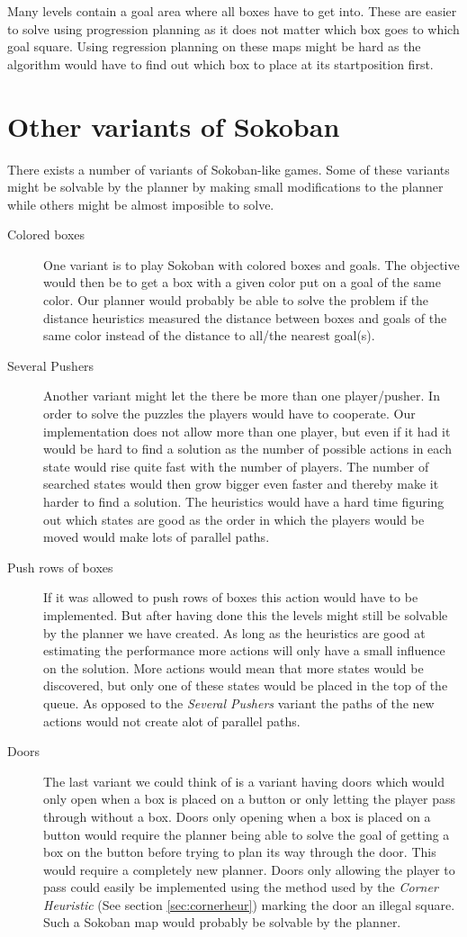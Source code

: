 Many levels contain a goal area where all boxes have to get into. These are easier to solve using progression planning as it does not matter which box goes to which goal square. Using regression planning on these maps might be hard as the algorithm would have to find out which box to place at its startposition first.

\section{Other variants of Sokoban}
There exists a number of variants of Sokoban-like games. Some of these variants might be solvable by the planner by making small modifications to the planner while others might be almost imposible to solve.

\begin{description}
\item[Colored boxes] One variant is to play Sokoban with colored boxes and goals. The objective would then be to get a box with a given color put on a goal of the same color. Our planner would probably be able to solve the problem if the distance heuristics measured the distance between boxes and goals of the same color instead of the distance to all/the nearest goal(s).
\item[Several Pushers] Another variant might let the there be more than one player/pusher. In order to solve the puzzles the players would have to cooperate. Our implementation does not allow more than one player, but even if it had it would be hard to find a solution as the number of possible actions in each state would rise quite fast with the number of players. The number of searched states would then grow bigger even faster and thereby make it harder to find a solution. The heuristics would have a hard time figuring out which states are good as the order in which the players would be moved would make lots of parallel paths.
\item[Push rows of boxes] If it was allowed to push rows of boxes this action would have to be implemented. But after having done this the levels might still be solvable by the planner we have created. As long as the heuristics are good at estimating the performance more actions will only have a small influence on the solution. More actions would mean that more states would be discovered, but only one of these states would be placed in the top of the queue. As opposed to the \textit{Several Pushers} variant the paths of the new actions would not create alot of parallel paths.
\item[Doors] The last variant we could think of is a variant having doors which would only open when a box is placed on a button or only letting the player pass through without a box. Doors only opening when a box is placed on a button would require the planner being able to solve the goal of getting a box on the button before trying to plan its way through the door. This would require a completely new planner. Doors only allowing the player to pass could easily be implemented using the method used by the \textit{Corner Heuristic} (See section \ref{sec:cornerheur}) marking the door an illegal square. Such a Sokoban map would probably be solvable by the planner.
\end{description}
